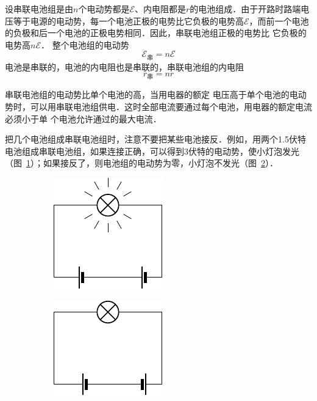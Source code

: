 设串联电池组是由$n$个电动势都是$\mathcal{E}$、内电阻都是$r$的电池组成．由于开路时路端电压等于电源的电动势，每一个电池正极的电势比它负极的电势高$\mathcal{E}$，而前一个电池的负极和后一个电池的正极电势相同．因此，串联电池组正极的电势比
它负极的电势高$n\mathcal{E}$．
整个电池组的电动势
\[\mathcal{E}_{\text{串}}=n\mathcal{E}\]
电池是串联的，电池的内电阻也是串联的，串联电池组的内电阻
\[r_{\text{串}}=nr\]


串联电池组的电动势比单个电池的高，当用电器的额定
电压高于单个电池的电动势时，可以用串联电池组供电．这时全部电流要通过每个电池，用电器的额定电流必须小于单
个电池允许通过的最大电流．

把几个电池组成串联电池组时，注意不要把某些电池接反．例如，用两个1.5伏特电池组成串联电池组，如果连接正确，可以得到3伏特的电动势，使小灯泡发光（图~\ref{fig_B_7-34a}）；如果接反了，则电池组的电动势为零，小灯泡不发光（图~\ref{fig_B_7-34b}）．
\begin{figure}[htbp]
    \centering
    \begin{subfigure}{0.4\linewidth}
        \centering
        \includegraphics{fig/B/7-34a.pdf}
        \caption{}\label{fig_B_7-34a}
    \end{subfigure}
    \hfil
    \begin{subfigure}{0.4\linewidth}
        \centering
        \includegraphics{fig/B/7-34b.pdf}
        \caption{}\label{fig_B_7-34b}
    \end{subfigure}
    \caption{}\label{fig_B_7-34}
\end{figure}



